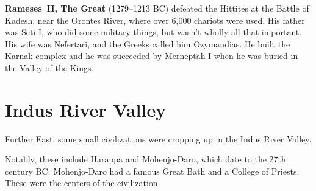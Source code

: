 \textbf{Rameses~II, The Great} (1279--1213 BC) defeated the Hittites at the Battle of Kadesh, near the Orontes River,
where over 6,000 chariots were used.
His father was Seti I, who did some military things, but wasn't wholly all that important.
His wife was Nefertari, and the Greeks called him Ozymandias.
He built the Karnak complex and he was succeeded by Merneptah I when he was buried in the Valley of the Kings.

\section{Indus River Valley}

Further East, some small civilizations were cropping up in the Indus River Valley.

Notably, these include Harappa and Mohenjo-Daro, which date to the 27th century BC\@.
Mohenjo-Daro had a famous Great Bath and a College of Priests.
These were the centers of the civilization.
